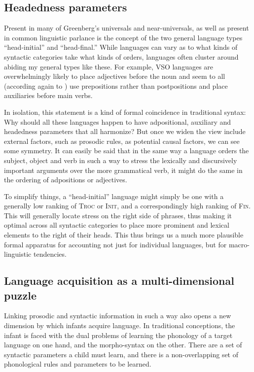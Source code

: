 \documentclass{article}
\newcommand{\finphi}{\textsc{Fin\textphi}}
\newcommand{\initphi}{\textsc{Init\textphi}}
\newcommand{\troc}{\textsc{Troc}}
\begin{document}
\subsection{Headedness parameters}

Present in many of Greenberg's universals and near-universals, as well as present in common linguistic parlance is the concept of the two general language types ``head-initial'' and ``head-final.''
While languages can vary as to what kinds of syntactic categories take what kinds of orders, languages often cluster around abiding my general types like these.
For example, VSO languages are overwhelmingly likely to place adjectives before the noun and seem to all (according again to \textcite{greenberg63}) use prepositions rather than postpositions and place auxiliaries before main verbs.

In isolation, this statement is a kind of formal coincidence in traditional syntax: Why should all these languages happen to have adpositional, auxiliary and headedness parameters that all harmonize? But once we widen the view include external factors, such as prosodic rules, as potential causal factors, we can see some symmetry.
It can easily be said that in the same way a language orders the subject, object and verb in such a way to stress the lexically and discursively important arguments over the more grammatical verb, it might do the same in the ordering of adpositions or adjectives.

To simplify things, a ``head-initial'' language might simply be one with a generally low ranking of {\troc} or {\initphi}, and a correspondingly high ranking of {\finphi}.
This will generally locate stress on the right side of phrases, thus making it optimal across all syntactic categories to place more prominent and lexical elements to the right of their heads.
This thus brings us a much more plausible formal apparatus for accounting not just for individual languages, but for macro-linguistic tendencies.

\subsection{Language acquisition as a multi-dimensional puzzle}

Linking prosodic and syntactic information in such a way also opens a new dimension by which infants acquire language.
In traditional conceptions, the infant is faced with the dual problems of learning the phonology of a target language on one hand, and the morpho-syntax on the other.
There are a set of syntactic parameters a child must learn, and there is a non-overlapping set of phonological rules and parameters to be learned.
\end{document}
